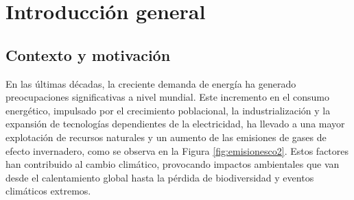

\chapter{Introducción general} %

\label{Chapter1} %
\label{IntroGeneral}



\newcommand{\keyword}[1]{\textbf{#1}}
\newcommand{\tabhead}[1]{\textbf{#1}}
\newcommand{\code}[1]{\texttt{#1}}
\newcommand{\file}[1]{\texttt{\bfseries#1}}
\newcommand{\option}[1]{\texttt{\itshape#1}}
\newcommand{\grados}{$^{\circ}$}



\section{Contexto y motivación}

En las últimas décadas, la creciente demanda de energía ha generado preocupaciones significativas a nivel mundial. Este incremento en el consumo energético, impulsado por el crecimiento poblacional, la industrialización y la expansión de tecnologías dependientes de la electricidad, ha llevado a una mayor explotación de recursos naturales y un aumento de las emisiones de gases de efecto invernadero, como se observa en la Figura \ref{fig:emisionesco2}. Estos factores han contribuido al cambio climático, provocando impactos ambientales que van desde el calentamiento global hasta la pérdida de biodiversidad y eventos climáticos extremos.

